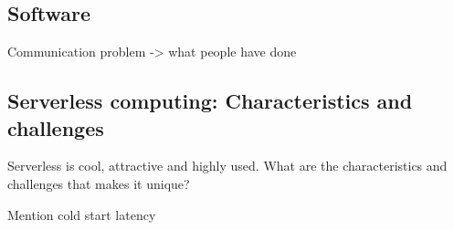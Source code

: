 \documentclass[../main.tex]{subfiles}
\begin{document}
\begin{refsection}
\section{Software}

Communication problem -> what people have done

\subsection{Serverless computing: Characteristics and challenges}
\label{sec:serverless}
Serverless is cool, attractive and highly used. What are the characteristics and challenges that makes it unique?

Mention cold start latency

\ifx\chapincluded\undefined
  \printbibliography
  \end{refsection}
 \fi
\end{document}
